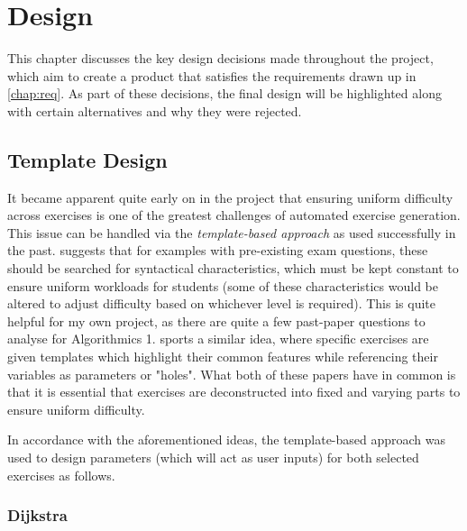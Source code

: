 \documentclass{l4proj}
\begin{document}
\chapter{Design}
\label{chap:des}

This chapter discusses the key design decisions made throughout the project, which aim to create a product that satisfies the requirements drawn up in \autoref{chap:req}. As part of these decisions, the final design will be highlighted along with certain alternatives and why they were rejected.

\section{Template Design}

It became apparent quite early on in the project that ensuring uniform difficulty across exercises is one of the greatest challenges of automated exercise generation. This issue can be handled via the \emph{template-based approach} as used successfully in the past. \citet{Hoz21} suggests that for examples with pre-existing exam questions, these should be searched for syntactical characteristics, which must be kept constant to ensure uniform workloads for students (some of these characteristics would be altered to adjust difficulty based on whichever level is required). This is quite helpful for my own project, as there are quite a few past-paper questions to analyse for Algorithmics 1. \citet{Sad12} sports a similar idea, where specific exercises are given templates which highlight their common features while referencing their variables as parameters or "holes". What both of these papers have in common is that it is essential that exercises are deconstructed into fixed and varying parts to ensure uniform difficulty.

In accordance with the aforementioned ideas, the template-based approach was used to design parameters (which will act as user inputs) for both selected exercises as follows.

\subsection{Dijkstra}
\end{document}
